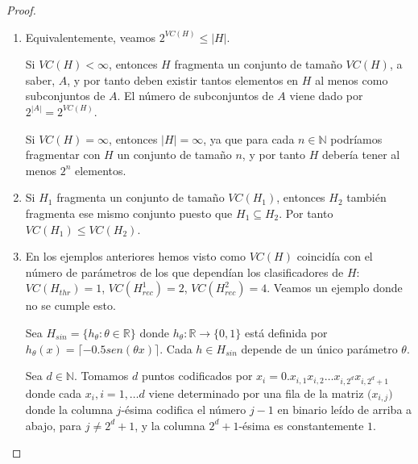 \begin{proof}~
 \begin{enumerate}[i]
  \item Equivalentemente, veamos $2^{VC(H)} \le |H|$. 
  
  Si $VC(H) < \infty$, entonces $H$ fragmenta un conjunto de tamaño
  $VC(H)$, a saber, $A$, y por tanto deben existir tantos elementos en $H$ al menos como subconjuntos de $A$. El número de
  subconjuntos de $A$ viene dado por $2^{|A|} = 2^{VC(H)}$. 
  
  Si $VC(H) = \infty$, entonces $|H| = \infty$, ya que para cada 
  $n\in \mathbb{N}$ podríamos fragmentar con $H$ un conjunto de tamaño $n$, y por tanto $H$ debería tener al menos $2^n$ 
  elementos.
  
  \item Si $H_1$ fragmenta un conjunto de tamaño $VC(H_1)$, entonces $H_2$ también fragmenta ese mismo conjunto puesto que
  $H_1 \subseteq H_2$. Por tanto $VC(H_1) \le VC(H_2)$.
 
  \item En los ejemplos anteriores hemos visto como $VC(H)$ coincidía con el número de parámetros de los que dependían los
  clasificadores de $H$: $VC(H_{thr}) = 1$, $VC(H^1_{rec}) = 2$, $VC(H^2_{rec}) = 4$. Veamos un ejemplo donde no se cumple
  esto.
  
  Sea $H_{sin} = \{h_{\theta}: \theta \in \mathbb{R}\}$ donde $h_{\theta}: \mathbb{R} \rightarrow \{0,1\}$ está definida por 
  $h_\theta (x) = \lceil -0.5sen(\theta x) \rceil$. Cada $h \in H_{sin}$ depende de un único parámetro $\theta$.
  
  Sea $d\in \mathbb{N}$. Tomamos $d$ puntos codificados por $x_i = 0.x_{i,1} x_{i,2} \ldots x_{i, 2^d} x_{i, 2^d+1}$ 
  donde cada $x_{i}, i=1, \ldots d$ viene determinado por una fila de la matriz $\bigg(x_{i,j}\bigg)$
  donde la columna $j$-ésima codifica el número $j-1$ en binario leído de arriba a abajo, para $j\neq 2^d+1$, y la columna 
  $2^d+1$-ésima es constantemente $1$.
  

\end{enumerate}
\end{proof}
